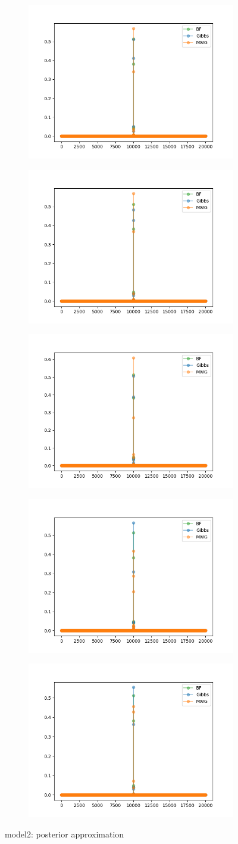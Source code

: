 \begin{figure}[h]
    \centering
    \begin{subfigure}
    	\centering
        \includegraphics[width=0.3\linewidth]{../../plots/Posterior_M2_N20000_NMCMC3_seed0_diffind2.png}
    \end{subfigure}
    \begin{subfigure}
        \centering
    	\includegraphics[width=0.3\linewidth]{../../plots/Posterior_M2_N20000_NMCMC3_seed1_diffind2.png}
	\end{subfigure}
	\begin{subfigure}
	    \centering
    	\includegraphics[width=0.3\linewidth]{../../plots/Posterior_M2_N20000_NMCMC3_seed2_diffind2.png}
	\end{subfigure}
	\begin{subfigure}
	    \centering
    	\includegraphics[width=0.3\linewidth]{../../plots/Posterior_M2_N20000_NMCMC3_seed3_diffind2.png}
	\end{subfigure}
	\begin{subfigure}
	    \centering
    	\includegraphics[width=0.3\linewidth]{../../plots/Posterior_M2_N20000_NMCMC3_seed4_diffind2.png}
	\end{subfigure}
	\caption{model2: posterior approximation}
\end{figure}


